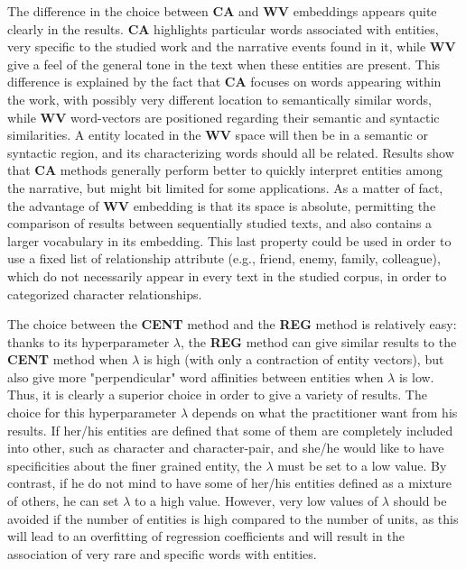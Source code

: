 \documentclass[
twocolumn,
]{ceurart}
\begin{document}
The difference in the choice between \textbf{CA} and \textbf{WV} embeddings appears quite clearly in the results. \textbf{CA} highlights particular words associated with entities, very specific to the studied work and the narrative events found in it, while \textbf{WV} give a feel of the general tone in the text when these entities are present. This difference is explained by the fact that \textbf{CA} focuses on words appearing within the work, with possibly very different location to semantically similar words, while \textbf{WV} word-vectors are positioned regarding their semantic and syntactic similarities. A entity located in the \textbf{WV} space will then be in a semantic or syntactic region, and its characterizing words should all be related. Results show that \textbf{CA} methods generally perform better to quickly interpret entities among the narrative, but might bit limited for some applications. As a matter of fact, the advantage of \textbf{WV} embedding is that its space is absolute, permitting the comparison of results between sequentially studied texts, and also contains a larger vocabulary in its embedding. This last property could be used in order to use a fixed list of relationship attribute (e.g., friend, enemy, family, colleague), which do not necessarily appear in every text in the studied corpus, in order to categorized character relationships.

The choice between the \textbf{CENT} method and the \textbf{REG} method is relatively easy: thanks to its hyperparameter $\lambda$, the \textbf{REG} method can give similar results to the \textbf{CENT} method when $\lambda$ is high (with only a contraction of entity vectors), but also give more "perpendicular" word affinities between entities when $\lambda$ is low. Thus, it is clearly a superior choice in order to give a variety of results. The choice for this hyperparameter $\lambda$ depends on what the practitioner want from his results. If her/his entities are defined that some of them are completely included into other, such as character and character-pair, and she/he would like to have specificities about the finer grained entity, the $\lambda$ must be set to a low value. By contrast, if he do not mind to have some of her/his entities defined as a mixture of others, he can set $\lambda$ to a high value. However, very low values of $\lambda$ should be avoided if the number of entities is high compared to the number of units, as this will lead to an overfitting of regression coefficients and will result in the association of very rare and specific words with entities.
\end{document}
